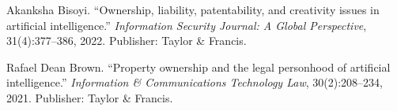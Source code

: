 \documentclass[11pt]{article}
\begin{document}
\begin{thebibliography}{9}
Akanksha Bisoyi.
``Ownership, liability, patentability, and creativity issues in artificial intelligence.''
\textit{Information Security Journal: A Global Perspective}, 31(4):377--386, 2022.
Publisher: Taylor \& Francis.

Rafael Dean Brown.
``Property ownership and the legal personhood of artificial intelligence.''
\textit{Information \& Communications Technology Law}, 30(2):208--234, 2021.
Publisher: Taylor \& Francis.


\end{thebibliography}
\end{document}
